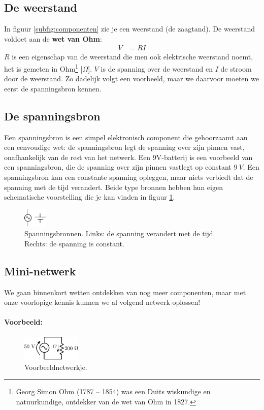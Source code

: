 \documentclass{article}
\begin{document}
\subsection{De weerstand}

In figuur \ref{subfig:componenten} zie je een weerstand (de zaagtand). De weerstand voldoet aan de \textbf{wet van Ohm}: 
\begin{align}
	V &= RI
\end{align} 
$R$ is een eigenschap van de  weerstand die men ook elektrische weerstand noemt, het is gemeten in Ohm\footnote{Georg Simon Ohm (1787 – 1854) was een Duits wiskundige en natuurkundige, ontdekker van de wet van Ohm in 1827.} [$\Omega$]. $V$ is de spanning over de weerstand en $I$ de stroom door de weerstand. Zo dadelijk volgt een voorbeeld, maar we daarvoor moeten we eerst de spanningsbron kennen. 

\subsection{De spanningsbron}

 Een spanningsbron is een simpel elektronisch component die gehoorzaamt aan een eenvoudige wet: de spanningsbron legt de spanning over zijn pinnen vast, onafhankelijk van de rest van het netwerk. Een 9V-batterij is een voorbeeld van een spanningsbron, die de spanning over zijn pinnen vastlegt op constant $9~V$. Een spanningsbron kan een constante spanning opleggen, maar niets verbiedt dat de spanning met de tijd verandert. Beide type bronnen hebben hun eigen schematische voorstelling die je kan vinden in figuur \ref{fig:vbron}.

\begin{figure}[htbp]
	\centering
	\includegraphics[width=0.1\textwidth]{spanningsbron.pdf}
	\caption{Spanningsbronnen. Links: de spanning verandert met de tijd. Rechts: de spanning is constant.}
	\label{fig:vbron}
\end{figure}

\subsection{Mini-netwerk}
We gaan binnenkort wetten ontdekken van nog meer componenten, maar met onze voorlopige kennis kunnen we al volgend netwerk oplossen!
\paragraph*{Voorbeeld:} 
\begin{figure}[h!]
	\centering
	\includegraphics[width=0.25\textwidth]{vbweerstand.pdf}
	\caption{Voorbeeldnetwerkje.}
	\label{fig:vbweerstand}
\end{figure}
\end{document}
